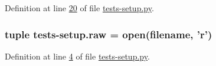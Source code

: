 Definition at line \hyperlink{tests-setup_8py_source_l00020}{20} of file \hyperlink{tests-setup_8py_source}{tests-\/setup.\-py}.

\hypertarget{namespacetests-setup_a1788203b7bbd6108e09617328eaeceb9}{
\subsubsection[{raw}]{\setlength{\rightskip}{0pt plus 5cm}tuple tests-\/setup.\-raw = open({\bf filename}, 'r')}}\label{namespacetests-setup_a1788203b7bbd6108e09617328eaeceb9}


Definition at line \hyperlink{tests-setup_8py_source_l00004}{4} of file \hyperlink{tests-setup_8py_source}{tests-\/setup.\-py}.

